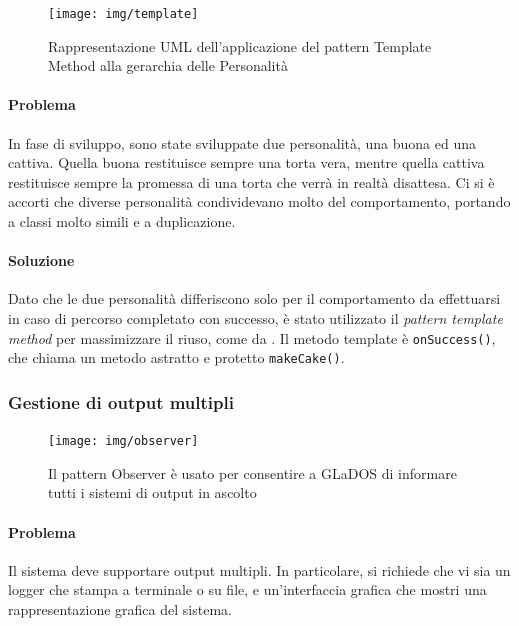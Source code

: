 \documentclass[a4paper,12pt]{report}
\begin{document}
\begin{figure}[H]
    \centering{}
    \texttt{[image: img/template]}
    \caption{Rappresentazione UML dell'applicazione del pattern Template Method alla gerarchia delle Personalità}
    \label{img:template}
\end{figure}

\paragraph{Problema} In fase di sviluppo, sono state sviluppate due personalità, una buona ed una cattiva.
Quella buona restituisce sempre una torta vera, mentre quella cattiva restituisce sempre la
promessa di una torta che verrà in realtà disattesa.
Ci si è accorti che diverse personalità condividevano molto del comportamento,
portando a classi molto simili e a duplicazione.

\paragraph{Soluzione} Dato che le due personalità differiscono solo per il comportamento da effettuarsi in caso di percorso completato con successo,
è stato utilizzato il \textit{pattern template method} per massimizzare il riuso, come da .
Il metodo template è \texttt{onSuccess()}, che chiama un metodo astratto e protetto
\texttt{makeCake()}.

\subsubsection{Gestione di output multipli}

\begin{figure}[H]
    \centering{}
    \texttt{[image: img/observer]}
    \caption{Il pattern Observer è usato per consentire a GLaDOS di informare tutti i sistemi di output in ascolto}
    \label{img:observer}
\end{figure}

\paragraph{Problema} Il sistema deve supportare output multipli. In particolare, si richiede che vi sia un logger che stampa a terminale o su file,
e un'interfaccia grafica che mostri una rappresentazione grafica del sistema.
\end{document}
